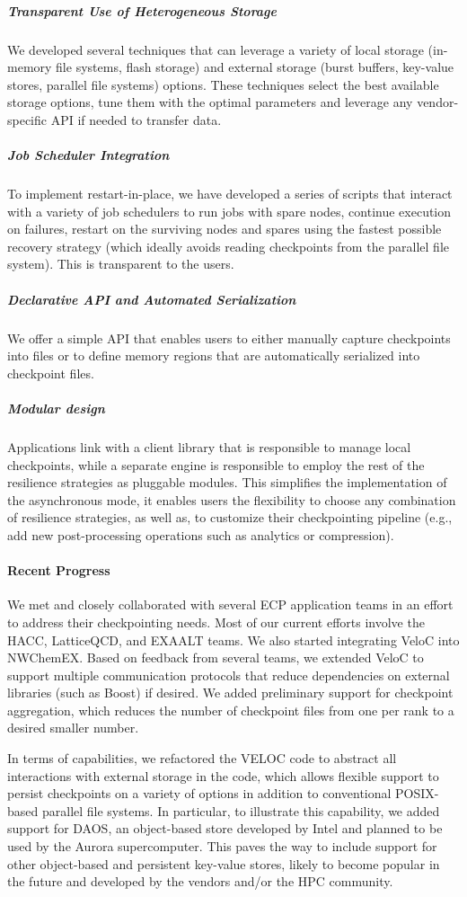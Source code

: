 \subparagraph{Transparent Use of Heterogeneous Storage} We
developed several techniques that can leverage a variety of local
storage (in-memory file systems, flash storage) and external storage
(burst buffers, key-value stores, parallel file systems)
options. These techniques select the best available storage options,
tune them with the optimal parameters and leverage any vendor-specific
API if needed to transfer data.


\subparagraph{Job Scheduler Integration} To implement
restart-in-place, we have developed a series of scripts that interact
with a variety of job schedulers to run jobs with spare nodes,
continue execution on failures, restart on the surviving nodes and
spares using the fastest possible recovery strategy (which ideally
avoids reading checkpoints from the parallel file system). This is
transparent to the users.


\subparagraph{Declarative API and Automated Serialization} We
offer a simple API that enables users to either manually capture
checkpoints into files or to define memory regions that are
automatically serialized into checkpoint files.


\subparagraph{Modular design} Applications link with a client
library that is responsible to manage local checkpoints, while a
separate engine is responsible to employ the rest of the resilience
strategies as pluggable modules. This simplifies the implementation
of the asynchronous mode, it enables users the flexibility to choose any
combination of resilience strategies, as well as, to customize their
checkpointing pipeline (e.g., add new post-processing operations such
as analytics or compression).

\paragraph{Recent Progress}

We met and closely collaborated with several ECP application teams in
an effort to address their checkpointing needs. Most of our current
efforts involve the HACC, LatticeQCD, and EXAALT teams. We also
started integrating VeloC into NWChemEX. Based on feedback from
several teams, we extended VeloC to support multiple communication
protocols that reduce dependencies on external libraries (such as
Boost) if desired.  We added preliminary support for
checkpoint aggregation, which reduces the number of checkpoint files
from one per rank to a desired smaller number.

In terms of capabilities, we refactored the VELOC code to abstract all
interactions with external storage in the code, which allows flexible
support to persist checkpoints on a variety of options in addition to
conventional POSIX-based parallel file systems. In particular, to
illustrate this capability, we added support for DAOS, an object-based
store developed by Intel and planned to be used by the Aurora
supercomputer. This paves the way to include support for other
object-based and persistent key-value stores, likely to become popular
in the future and developed by the vendors and/or the HPC community.

